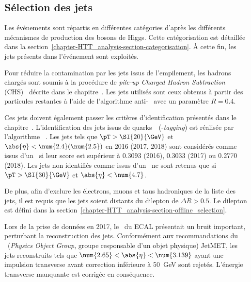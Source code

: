\subsection{Sélection des jets}\label{chapter-HTT_analysis-section-jets}
Les événements sont répartis en différentes catégories d'après les différents mécanismes de production des bosons de Higgs.
Cette catégorisation est détaillée dans la section~\ref{chapter-HTT_analysis-section-categorisation}.
À cette fin, les jets présents dans l'événement sont exploités.
\par
Pour réduire la contamination par les jets issus de l'empilement, les hadrons chargés sont soumis à la procédure de \emph{pile-up Charged Hadron Subtraction} (CHS)~\cite{CMS-PAS-JME-14-001} décrite dans le chapitre~.
Les jets utilisés sont ceux obtenus à partir des particules restantes à l'aide de l'algorithme anti-\kT~\cite{Cacciari_antikT} avec un paramètre $R=\num{0.4}$.
\par
Ces jets doivent également passer les critères d'identification présentés dans le chapitre~.
L'identification des jets issus de quarks~\quarkb\ (\quarkb-\emph{tagging}) est réalisée par l'algorithme \DeepCSV~\cite{Sirunyan_heavy_flavor_jets_2018,DeepJet}.
Les jets tels que $\pT > \SI{20}{\GeV}$ et $\abs{\eta}<\num{2.4} (\num{2.5})$ en 2016 (2017, 2018) sont considérés comme issus d'un \quarkb\ si leur score est supérieur à \num{0.3093} (2016), \num{0.3033} (2017) ou \num{0.2770} (2018).
Les jets non identifiés comme issus d'un \quarkb\ ne sont retenus que si $\pT > \SI{30}{\GeV}$ et $\abs{\eta}<\num{4.7}$.
\par
De plus, afin d'exclure les électrons, muons et taus hadroniques de la liste des jets, il est requis que les jets soient distants du dilepton de $\Delta R > \num{0.5}$.
Le dilepton est défini dans la section~\ref{chapter-HTT_analysis-section-offline_selection}.
\par
Lors de la prise de données en 2017, le \CMSendcap\ du ECAL présentait un bruit important, perturbant la reconstruction des jets.
Conformément aux recommandations du \POG\ (\emph{Physics Object Group}, groupe responsable d'un objet physique) JetMET, les jets reconstruits tels que $\num{2.65} < \abs{\eta} < \num{3.139}$ ayant une impulsion transverse avant correction inférieure à \SI{50}{\GeV} sont rejetés.
L'énergie transverse manquante est corrigée en conséquence.